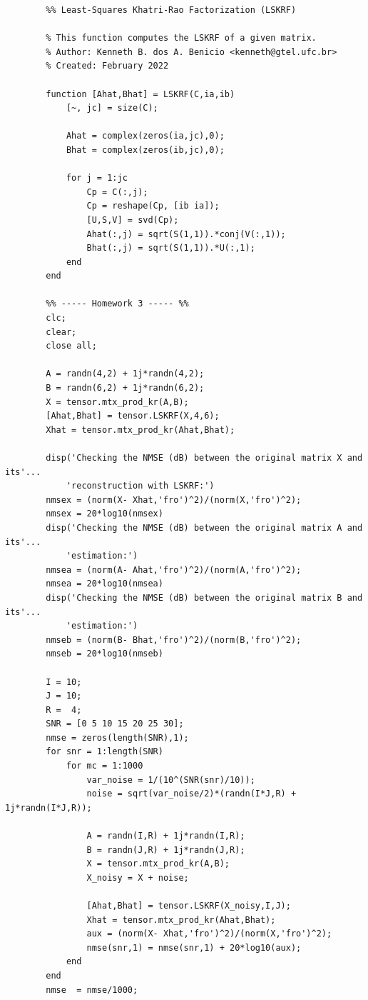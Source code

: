 \documentclass[a4paper,10pt]{article}
\begin{document}
    \begin{verbatim}
        %% Least-Squares Khatri-Rao Factorization (LSKRF)

        % This function computes the LSKRF of a given matrix.   
        % Author: Kenneth B. dos A. Benicio <kenneth@gtel.ufc.br>
        % Created: February 2022

        function [Ahat,Bhat] = LSKRF(C,ia,ib)
            [~, jc] = size(C);
            
            Ahat = complex(zeros(ia,jc),0);
            Bhat = complex(zeros(ib,jc),0);
            
            for j = 1:jc
                Cp = C(:,j);
                Cp = reshape(Cp, [ib ia]);
                [U,S,V] = svd(Cp);
                Ahat(:,j) = sqrt(S(1,1)).*conj(V(:,1));
                Bhat(:,j) = sqrt(S(1,1)).*U(:,1);
            end
        end

        %% ----- Homework 3 ----- %%
        clc;
        clear;
        close all;

        A = randn(4,2) + 1j*randn(4,2);
        B = randn(6,2) + 1j*randn(6,2);
        X = tensor.mtx_prod_kr(A,B);
        [Ahat,Bhat] = tensor.LSKRF(X,4,6);
        Xhat = tensor.mtx_prod_kr(Ahat,Bhat);

        disp('Checking the NMSE (dB) between the original matrix X and its'... 
            'reconstruction with LSKRF:')
        nmsex = (norm(X- Xhat,'fro')^2)/(norm(X,'fro')^2);
        nmsex = 20*log10(nmsex)
        disp('Checking the NMSE (dB) between the original matrix A and its'...
            'estimation:')
        nmsea = (norm(A- Ahat,'fro')^2)/(norm(A,'fro')^2);
        nmsea = 20*log10(nmsea)
        disp('Checking the NMSE (dB) between the original matrix B and its'... 
            'estimation:')
        nmseb = (norm(B- Bhat,'fro')^2)/(norm(B,'fro')^2);
        nmseb = 20*log10(nmseb)

        I = 10;
        J = 10;
        R =  4;
        SNR = [0 5 10 15 20 25 30];
        nmse = zeros(length(SNR),1);
        for snr = 1:length(SNR)
            for mc = 1:1000
                var_noise = 1/(10^(SNR(snr)/10));
                noise = sqrt(var_noise/2)*(randn(I*J,R) + 1j*randn(I*J,R));
                
                A = randn(I,R) + 1j*randn(I,R);
                B = randn(J,R) + 1j*randn(J,R);
                X = tensor.mtx_prod_kr(A,B);
                X_noisy = X + noise;
                
                [Ahat,Bhat] = tensor.LSKRF(X_noisy,I,J);
                Xhat = tensor.mtx_prod_kr(Ahat,Bhat);
                aux = (norm(X- Xhat,'fro')^2)/(norm(X,'fro')^2);
                nmse(snr,1) = nmse(snr,1) + 20*log10(aux);
            end
        end
        nmse  = nmse/1000;


\end{verbatim}
\end{document}
